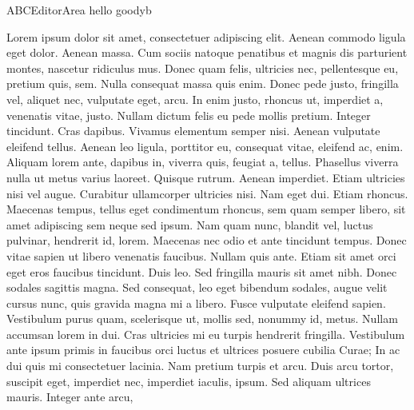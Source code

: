 ABCEditorArea hello goodyb

Lorem ipsum dolor sit amet, consectetuer adipiscing elit. Aenean commodo ligula eget dolor. Aenean massa. Cum sociis natoque penatibus et magnis dis parturient montes, nascetur ridiculus mus. Donec quam felis, ultricies nec, pellentesque eu, pretium quis, sem. Nulla consequat massa quis enim. Donec pede justo, fringilla vel, aliquet nec, vulputate eget, arcu. In enim justo, rhoncus ut, imperdiet a, venenatis vitae, justo. Nullam dictum felis eu pede mollis pretium. Integer tincidunt. Cras dapibus. Vivamus elementum semper nisi. Aenean vulputate eleifend tellus. Aenean leo ligula, porttitor eu, consequat vitae, eleifend ac, enim. Aliquam lorem ante, dapibus in, viverra quis, feugiat a, tellus. Phasellus viverra nulla ut metus varius laoreet. Quisque rutrum. Aenean imperdiet. Etiam ultricies nisi vel augue. Curabitur ullamcorper ultricies nisi. Nam eget dui. Etiam rhoncus. Maecenas tempus, tellus eget condimentum rhoncus, sem quam semper libero, sit amet adipiscing sem neque sed ipsum. Nam quam nunc, blandit vel, luctus pulvinar, hendrerit id, lorem. Maecenas nec odio et ante tincidunt tempus. Donec vitae sapien ut libero venenatis faucibus. Nullam quis ante. Etiam sit amet orci eget eros faucibus tincidunt. Duis leo. Sed fringilla mauris sit amet nibh. Donec sodales sagittis magna. Sed consequat, leo eget bibendum sodales, augue velit cursus nunc, quis gravida magna mi a libero. Fusce vulputate eleifend sapien. Vestibulum purus quam, scelerisque ut, mollis sed, nonummy id, metus. Nullam accumsan lorem in dui. Cras ultricies mi eu turpis hendrerit fringilla. Vestibulum ante ipsum primis in faucibus orci luctus et ultrices posuere cubilia Curae; In ac dui quis mi consectetuer lacinia. Nam pretium turpis et arcu. Duis arcu tortor, suscipit eget, imperdiet nec, imperdiet iaculis, ipsum. Sed aliquam ultrices mauris. Integer ante arcu,

